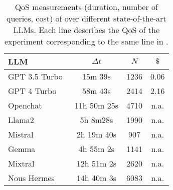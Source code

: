 \begin{table}
    \caption[\llmfkg{} \gls{QoS} measurements]{%
        \Gls{QoS} measurements (duration, number of queries, cost) of \llmfkg{} over different state-of-the-art LLMs.
        Each line describes the \gls{QoS} of the experiment corresponding to the same line in .
    }
    \centering
    \begin{tabular}{l | c c c} \toprule
        LLM & $\mathit{\Delta t}$ & $\mathit{N}$ & $\$$
        \\ \midrule
        GPT 3.5 Turbo~\cite{gpt3-2020} & 15m 39s & 1236 & 0.06
        \\
        GPT 4 Turbo~\cite{gpt4} & 58m 43s & 2414 & 2.16
        \\ \midrule
        Openchat~\cite{wang2023openchat} & 11h 50m 25s & 4710 & n.a.
        \\
        Llama2~\cite{llama2} & 5h 8m28s & 1990 & n.a.
        \\
        Mistral~\cite{mistral} & 2h 19m 40s & 907 & n.a.
        \\
        Gemma~\cite{gemini} & 4h 55m 2s & 1141 & n.a.
        \\ \midrule
        Mixtral~\cite{mixtral} & 12h 51m 2s & 2620 & n.a.
        \\
        Nous Hermes & 14h 40m 3s & 6083 & n.a.
        \\ \bottomrule
    \end{tabular}
    \label{tab:kgfiller-qos}
\end{table}